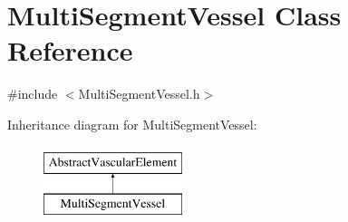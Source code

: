 \hypertarget{class_multi_segment_vessel}{}\section{Multi\+Segment\+Vessel Class Reference}
\label{class_multi_segment_vessel}


{\ttfamily \#include $<$Multi\+Segment\+Vessel.\+h$>$}

Inheritance diagram for Multi\+Segment\+Vessel\+:\begin{figure}[H]
\begin{center}
\leavevmode
\includegraphics[height=2.000000cm]{d3/dac/class_multi_segment_vessel}
\end{center}
\end{figure}
